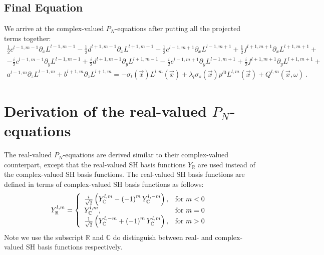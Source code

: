 \documentclass{egpubl}
\newcommand{\SHBR}{Y_{\mathbb{R}}} %
\newcommand{\SHBC}{Y_{\mathbb{C}}} %
\newcommand{\iu}{{i\mkern1mu}}
\begin{document}
\subsection{Final Equation}

We arrive at the complex-valued $P_N$-equations after putting all the projected terms together:
\begin{align*}
\frac{1}{2}c^{l-1, m-1}\partial_x L^{l-1,m-1} - \frac{1}{2}d^{l+1, m-1}\partial_x L^{l+1,m-1} - \frac{1}{2}e^{l-1, m+1}\partial_x L^{l-1,m+1} + \frac{1}{2}f^{l+1, m+1}\partial_x L^{l+1,m+1}+
\\
-\frac{i}{2}c^{l-1, m-1}\partial_y L^{l-1,m-1} + \frac{i}{2}d^{l+1, m-1}\partial_y L^{l+1,m-1} - \frac{i}{2}e^{l-1, m+1}\partial_y L^{l-1,m+1} + \frac{i}{2}f^{l+1, m+1}\partial_y L^{l+1,m+1} +
\\
a^{l-1, m}\partial_z L^{l-1,m}+b^{l+1, m}\partial_z L^{l+1,m}
=
-\sigma_t\left(\vec{x}\right)L^{l,m}\left(\vec{x}\right )
+
\lambda_l
\sigma_s(\vec{x})
p^{l0}L^{l,m}(\vec{x}) + Q^{l,m}\left(\vec{x}, \omega\right) \ .
\end{align*}


\section{Derivation of the real-valued $P_N$-equations \label{sec:real}}

The real-valued $P_N$-equations are derived similar to their complex-valued counterpart, except that the real-valued SH basis functions $\SHBR$ are used instead of the complex-valued SH basis functions. The real-valued SH basis functions are defined in terms of complex-valued SH basis functions as follows:
\begin{align}
\label{eq:real_sh_basis}
\SHBR^{l,m}=
\left\{
\begin{array}{lr}
\frac{\iu}{\sqrt{2}}\left(\SHBC^{l,m}-\left(-1\right)^m\SHBC^{l,-m}\right), & \text{for } m < 0\\
\SHBC^{l,m}, & \text{for } m = 0\\
\frac{1}{\sqrt{2}}\left(\SHBC^{l,-m}+\left(-1\right)^m\SHBC^{l,m}\right), & \text{for } m > 0
\end{array}
\right.
\end{align}
Note we use the subscript $\mathbb{R}$ and $\mathbb{C}$ do distinguish between real- and complex-valued SH basis functions respectively.
\end{document}
